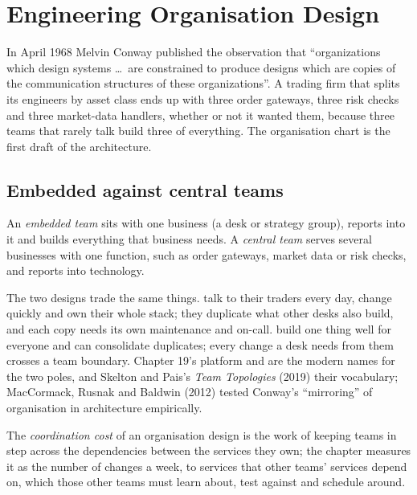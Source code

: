 \chapter{Engineering Organisation Design}\label{ch:fm:engineering-organisation-design}

In April 1968 Melvin Conway published the observation that ``organizations which design systems \dots\ are constrained to produce designs which are
copies of the communication structures of these organizations''. A trading firm that splits its engineers by asset class ends up with three order
gateways, three risk checks and three market-data handlers, whether or not it wanted them, because three teams that rarely talk build three of
everything. The organisation chart is the first draft of the architecture.

\section{Embedded against central teams}

\begin{definition}\label{def:fm:engineering-organisation-design:teams}
An \emph{embedded team} sits with one business (a desk or strategy group), reports into it and builds everything that business
needs. A \emph{central team} serves several businesses with one function, such as order gateways, market data or risk checks, and
reports into technology.
\end{definition}

The two designs trade the same things.  talk to their traders every day, change quickly and own their whole stack; they duplicate
what other desks also build, and each copy needs its own maintenance and on-call.  build one thing well for everyone and can
consolidate duplicates; every change a desk needs from them crosses a team boundary. Chapter 19's platform and  are the modern names
for the two poles, and Skelton and Pais's \emph{Team Topologies} (2019) their vocabulary; MacCormack, Rusnak and Baldwin (2012) tested Conway's
``mirroring'' of organisation in architecture empirically.

\begin{definition}\label{def:fm:engineering-organisation-design:coord}
The \emph{coordination cost} of an organisation design is the work of keeping teams in step across the dependencies
between the services they own; the chapter measures it as the number of changes a week, to services that other teams' services depend on, which
those other teams must learn about, test against and schedule around.
\end{definition}

